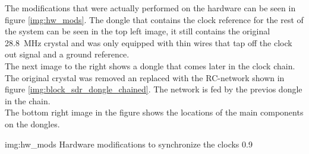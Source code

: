 The modifications that were actually performed on the
hardware can be seen in figure \ref{img:hw_mods}.
The dongle that contains the clock reference for
the rest of the system can be seen in the top left
image, it still contains the original
\SI{28.8}{\mega\hertz} crystal and was only equipped
with thin wires that tap off the clock out signal
and a ground reference. \\

The next image to the right shows a dongle
that comes later in the clock chain.
The original crystal was removed an replaced with
the RC-network shown in figure \ref{img:block_sdr_dongle_chained}.
The network is fed by the previos dongle in the chain. \\

The bottom right image in the figure shows the
locations of the main components on the dongles.

             {img:hw_mods}
             {Hardware modifications to synchronize the clocks}
             {0.9}
